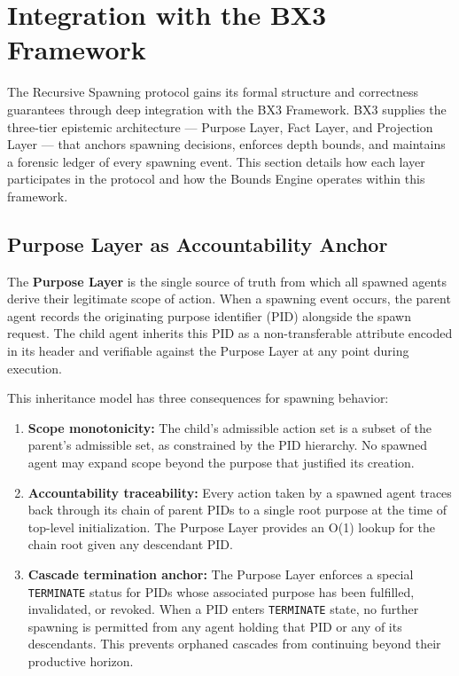 \section{Integration with the BX3 Framework}
\label{sec:bx3-integration}

The Recursive Spawning protocol gains its formal structure and
correctness guarantees through deep integration with the BX3 Framework.
BX3 supplies the three-tier epistemic architecture --- Purpose Layer,
Fact Layer, and Projection Layer --- that anchors spawning decisions,
enforces depth bounds, and maintains a forensic ledger of every
spawning event. This section details how each layer participates in
the protocol and how the Bounds Engine operates within this framework.

\subsection{Purpose Layer as Accountability Anchor}
\label{sec:purpose-layer-anchor}

The \textbf{Purpose Layer} is the single source of truth from which all
spawned agents derive their legitimate scope of action. When a spawning
event occurs, the parent agent records the originating purpose
identifier (PID) alongside the spawn request. The child agent inherits this
PID as a non-transferable attribute encoded in its header and verifiable
against the Purpose Layer at any point during execution.

This inheritance model has three consequences for spawning behavior:

\begin{enumerate}
  \item \textbf{Scope monotonicity:} The child's admissible action set is
        a subset of the parent's admissible set, as constrained by the
        PID hierarchy. No spawned agent may expand scope beyond the
        purpose that justified its creation.
  \item \textbf{Accountability traceability:} Every action taken by a
        spawned agent traces back through its chain of parent PIDs to a
        single root purpose at the time of top-level initialization. The
        Purpose Layer provides an O(1) lookup for the chain root given any
        descendant PID.
  \item \textbf{Cascade termination anchor:} The Purpose Layer enforces
        a special \texttt{TERMINATE} status for PIDs whose associated
        purpose has been fulfilled, invalidated, or revoked. When a PID
        enters \texttt{TERMINATE} state, no further spawning is permitted
        from any agent holding that PID or any of its descendants. This
        prevents orphaned cascades from continuing beyond their
        productive horizon.
\end{enumerate}

